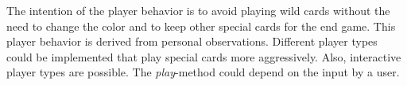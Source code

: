 The intention of the player behavior is to avoid playing wild cards without the need to change the color and to keep other special cards for the end game. This player behavior is derived from personal observations. Different player types could be implemented that play special cards more aggressively. Also, interactive player types are possible. The \textit{play}-method could depend on the input by a user.







